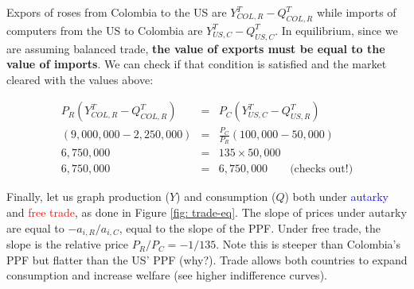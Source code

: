 \documentclass[11pt,letterpaper]{article}
\begin{document}
Expors of roses from Colombia to the US are $Y^T_{COL,R} - Q^T_{COL,R}$ while imports of computers from the US to Colombia are $Y^T_{US,C}-Q^T_{US,C}$. In equilibrium, since we are assuming balanced trade, \textbf{the value of exports must be equal to the value of imports}. We can check if that condition is satisfied and the market cleared with the values above:

\begin{eqnarray*}
    P_R \left( Y^T_{COL,R}- Q^T_{COL,R} \right) &=& P_C \left( Y^T_{US,C} - Q^T_{US,R} \right)  \\
    \left( 9{,}000{,}000 - 2{,}250{,}000 \right) &=& \frac{P_C}{P_R} \left( 100{,}000 - 50{,}000\right)  \\
      6{,}750{,}000  &=& 135 \times 50{,}000 \\
      6{,}750{,}000  &=& 6{,}750{,}000 \qquad \text{(checks out!)}
    \end{eqnarray*}

Finally, let us graph production ($Y$) and consumption ($Q$) both under \textcolor{blue}{autarky} and \textcolor{red}{free trade}, as done in Figure \ref{fig: trade-eq}. The slope of prices under autarky are equal to $-a_{i,R}/a_{i,C}$, equal to the slope of the PPF. Under free trade, the slope is the relative price $P_R/P_C = -1/135$. Note this is steeper than Colombia's PPF but flatter than the US' PPF (why?). Trade allows both countries to expand consumption and increase welfare (see higher indifference curves).
\end{document}
